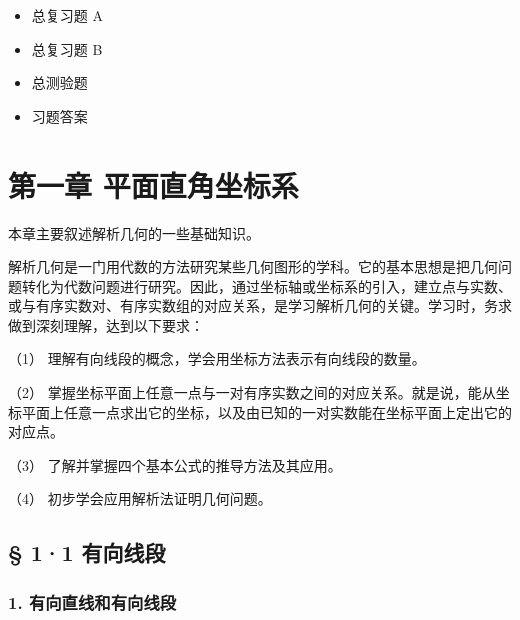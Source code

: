 \begin{itemize}
  \begin{itemize}
  \tightlist
  \item
    §7·1 极坐标的意义
  \item
    §7·2 极坐标和直角坐标的互化
  \item
    §7·3 描绘极坐标方程的曲线
  \item
    §7·4 求曲线的极坐标方程
  \item
    §7·5 直线和圆锥曲线的极坐标方程
  \item
    §7·6 等速螺线
  \item
    本章提要
  \item
    复习题七 A
  \item
    复习题七 B
  \item
    第七章测验题
  \end{itemize}
\item
  总复习题 A
\item
  总复习题 B
\item
  总测验题
\item
  习题答案
\end{itemize}

\chapter{第一章
平面直角坐标系}\label{ux7b2cux4e00ux7ae0-ux5e73ux9762ux76f4ux89d2ux5750ux6807ux7cfb}

本章主要叙述解析几何的一些基础知识。

解析几何是一门用代数的方法研究某些几何图形的学科。它的基本思想是把几何问题转化为代数问题进行研究。因此，通过坐标轴或坐标系的引入，建立点与实数、或与有序实数对、有序实数组的对应关系，是学习解析几何的关键。学习时，务求做到深刻理解，达到以下要求：

（1） 理解有向线段的概念，学会用坐标方法表示有向线段的数量。

（2）
掌握坐标平面上任意一点与一对有序实数之间的对应关系。就是说，能从坐标平面上任意一点求出它的坐标，以及由已知的一对实数能在坐标平面上定出它的对应点。

（3） 了解并掌握四个基本公式的推导方法及其应用。

（4） 初步学会应用解析法证明几何问题。

\section{§ 1·1 有向线段}\label{ux6709ux5411ux7ebfux6bb5}

\subsection{1.
有向直线和有向线段}\label{ux6709ux5411ux76f4ux7ebfux548cux6709ux5411ux7ebfux6bb5}

